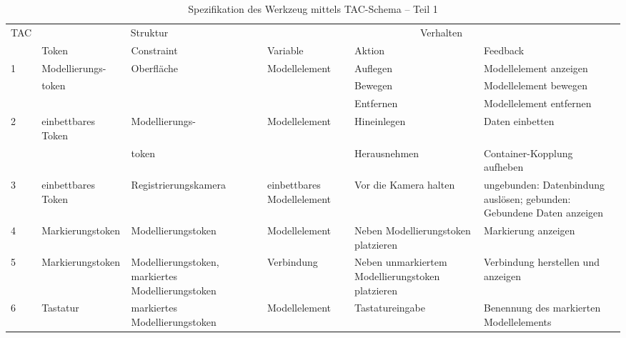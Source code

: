 \begin{table}[htbp]
	\centering
	\caption{Spezifikation des Werkzeug mittels TAC-Schema -- Teil 1}
\begin{tabular}{| p{0.8cm} || p{2.2cm} | p{2cm} || p{2cm} | p{2cm} | p{3cm} |}
  \hline
	TAC & \multicolumn{2}{|c||}{Struktur} & \multicolumn{3}{c|}{Verhalten} \\ 
	& Token & Constraint & Variable & Aktion & Feedback \\ \hline \hline
	\multirow{3}{*}{1} & Modell\-ierungs-  & Oberfläche & Modell\-element  & Auflegen & Modell\-element anzeigen \\ \cline{5-6} 
					   & token &			   &  & Bewegen & Modell\-element bewegen \\ \cline{5-6} 
					   & 	  &			   &		  & Entfernen & Modell\-element entfernen \\ \hline
	\multirow{2}{*}{2} & einbett\-bares Token & Modell\-ierungs-    & Modell\-element		  & Hinein\-legen & Daten einbetten \\ \cline{5-6}
					   &  & token   &  & Heraus\-nehmen & Container-Kopplung aufheben \\ \hline
	3 & einbett\-bares Token & Regist\-rierungs\-kamera & einbett\-bares Modell\-element & Vor die Kamera halten & ungebunden: Datenbindung auslösen; gebunden: Gebundene Daten anzeigen \\ \hline
	4 & Markierungs\-token & Modell\-ierungs\-token & Modell\-element & Neben Modell\-ierungs\-token platzieren	& Markierung anzeigen \\ \hline
	5 & Markierungs\-token & Modell\-ierungs\-token, markiertes Modell\-ierungs\-token & Verbindung & Neben unmarkiertem Modell\-ierungs\-token platzieren	& Verbindung herstellen und anzeigen \\ \hline  
	6 & Tastatur & markiertes Modell\-ierungs\-token & Modell\-element & Tastatur\-eingabe & Benennung des markierten Modellelements \\ \hline
\end{tabular} \\
	\label{tab:tac1}
\end{table}

